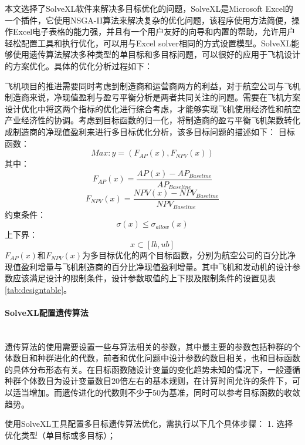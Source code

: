\documentclass[12pt,a4paper]{report}
\begin{document}
本文选择了SolveXL软件来解决多目标优化的问题，SolveXL是Microsoft Excel的一个插件，它使用NSGA-II算法来解决复杂的优化问题，该程序使用方法简便，操作Excel电子表格的能力强，并且有一个用户友好的向导和内置的帮助，允许用户轻松配置工具和执行优化，可以用与Excel solver相同的方式设置模型。SolveXL能够使用遗传算法解决多种类型的单目标和多目标问题，可以很好的应用于飞机设计的方案优化。具体的优化分析过程如下：

飞机项目的推进需要同时考虑到制造商和运营商两方的利益，对于航空公司与飞机制造商来说，净现值盈利与盈亏平衡分析是两者共同关注的问题。需要在飞机方案设计优化中将这两个指标的优化进行综合考虑，才能够实现飞机使用经济性和航空产业经济性的协调。考虑到目标函数的归一化，将制造商的盈亏平衡飞机架数转化成制造商的净现值盈利来进行多目标优化分析，该多目标问题的描述如下：
目标函数：
\begin{equation}
Max: y=(F_{AP}(x),F_{NPV}(x))
\end{equation}
其中：\begin{equation}
F_{AP}(x)=\frac{{AP}(x)-{AP}_{Baseline}}{{AP}_{Baseline}}
\end{equation}
\begin{equation}
F_{NPV}(x)=\frac{{NPV}(x)-{NPV}_{Baseline}}{{NPV}_{Baseline}}
\end{equation}
约束条件：
\begin{equation}
\sigma(x)\leq \sigma_{allow}(x)
\end{equation}
上下界：
\begin{equation}
x\subset[lb,ub]
\end{equation}
$F_{AP}(x)$和$F_{NPV}(x)$为多目标优化的两个目标函数，分别为航空公司的百分比净现值盈利增量与飞机制造商的百分比净现值盈利增量。其中飞机和发动机的设计参数应该满足设计的限制条件，设计参数取值的上下限及限制条件的设置见表\ref{tab:designtable}。
\paragraph{SolveXL配置遗传算法}~{}
\\

遗传算法的使用需要设置一些与算法相关的参数，其中最主要的参数包括种群的个体数目和种群进化的代数，前者和优化问题中设计参数的数目相关，也和目标函数的具体分布形态有关。在目标函数随设计变量的变化趋势未知的情况下，一般遵循种群个体数目为设计变量数目$20$倍左右的基本规则，在计算时间允许的条件下，可以适当增加。而遗传进化的代数则不少于$50$为基准，同时可以参考目标函数的收敛趋势。

使用SolveXL工具配置多目标遗传算法优化，需执行以下几个具体步骤：
1. 选择优化类型（单目标或多目标）；
\end{document}
